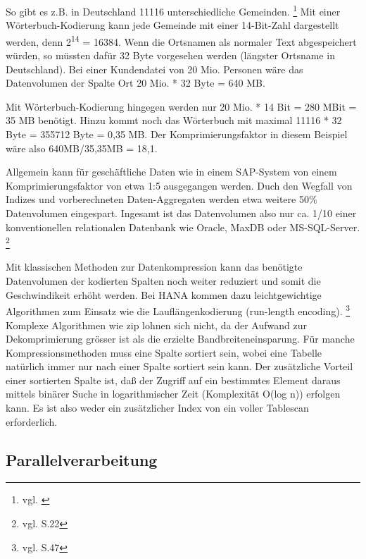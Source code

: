 So gibt es z.B. in Deutschland 11116 unterschiedliche Gemeinden. 
\footnote{vgl. \cite{Statista2014}}
Mit einer Wörterbuch-Kodierung kann jede Gemeinde mit einer 14-Bit-Zahl 
dargestellt werden, denn 2\textsuperscript{14} = 16384.
Wenn die Ortsnamen als normaler Text abgespeichert würden, so müssten dafür 32 Byte
vorgesehen werden (längster Ortsname in Deutschland). Bei einer Kundendatei von
20 Mio. Personen wäre das Datenvolumen der Spalte Ort 20 Mio. * 32 Byte = 640 MB.

Mit Wörterbuch-Kodierung hingegen werden nur 20 Mio. * 14 Bit = 280 MBit = 35 MB benötigt. 
Hinzu kommt noch das Wörterbuch mit maximal 11116 * 32 Byte = 355712 Byte = 0,35 MB.
Der Komprimierungsfaktor in diesem Beispiel wäre also 640MB/35,35MB = 18,1.

Allgemein kann für geschäftliche Daten wie in einem SAP-System von einem
Komprimierungsfaktor von etwa 1:5 ausgegangen werden. Duch den Wegfall von Indizes und 
vorberechneten Daten-Aggregaten werden etwa weitere 50\% Datenvolumen eingespart.
Ingesamt ist das Datenvolumen also nur ca. 1/10 einer konventionellen relationalen 
Datenbank wie Oracle, MaxDB oder MS-SQL-Server.
\footnote{vgl. \cite{Plattner2015} S.22}

Mit klassischen Methoden zur Datenkompression kann das benötigte Datenvolumen 
der kodierten Spalten noch weiter reduziert und somit die Geschwindikeit erhöht werden.
Bei HANA kommen dazu leichtgewichtige Algorithmen zum Einsatz wie die Lauflängenkodierung (run-length encoding).
\footnote{vgl. \cite{Plattner2015hpi} S.47}
Komplexe Algorithmen wie zip lohnen sich nicht, da der Aufwand zur Dekomprimierung
grösser ist als die erzielte Bandbreiteneinsparung.
Für manche Kompressionsmethoden muss eine Spalte sortiert sein, wobei eine Tabelle
natürlich immer nur nach einer Spalte sortiert sein kann.
Der zusätzliche Vorteil einer sortierten Spalte ist, daß der Zugriff auf ein bestimmtes 
Element daraus mittels binärer Suche in logarithmischer Zeit (Komplexität O(log n)) 
erfolgen kann. Es ist also weder ein zusätzlicher Index von ein voller Tablescan erforderlich.

\subsection{Parallelverarbeitung}

